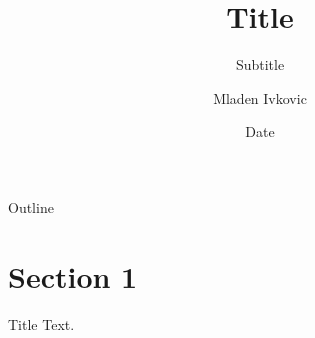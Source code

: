 





\title[shortform]{Title}
\subtitle[shortform-subtitle]{Subtitle}
\author[M. Ivkovic]{Mladen Ivkovic}


\date[SHORT DATE]{Date}













\begin{frame}{}
	\titlepage
\end{frame}


\begin{frame}{Outline}\label{tableofcontents}
   \tableofcontents
\end{frame}

\section{Section 1}
\begin{frame}{Title}
    Text.
\end{frame}


